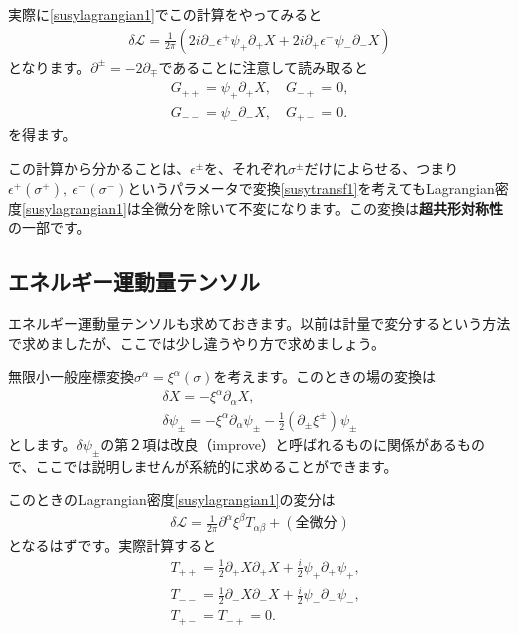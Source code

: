 \documentclass[report,paper=a4, fontsize=12pt, line_length=16cm, number_of_lines=34,dvipdfmx]{jlreq}
\numberwithin{equation}{chapter}
\numberwithin{equation}{section}
\newcommand{\del}{\partial}
\newcommand{\kyou}[1]{{\sffamily \bfseries #1}}
\newcommand{\Lcal}{\mathcal{L}}
\begin{document}
実際に\eqref{susylagrangian1}でこの計算をやってみると
\begin{align}
  \delta \Lcal = \frac{1}{2\pi}
  \left( 
    2i\del_{-}\epsilon^{+} \psi_{+}\del_{+}X +2i \del_{+}\epsilon^{-}\psi_{-}\del_{-}X
   \right)
\end{align}
となります。$\del^{\pm}=-2\del_{\mp}$であることに注意して読み取ると
\begin{align}
  G_{++}=\psi_{+}\del_{+}X,\quad G_{-+}=0,\nonumber\\
  G_{--}=\psi_{-}\del_{-}X,\quad G_{+-}=0.
\label{SUSYcurrent1}
\end{align}
を得ます。

この計算から分かることは、$\epsilon^{\pm}$を、それぞれ$\sigma^{\pm}$だけによらせる、つまり$\epsilon^{+}(\sigma^{+}),\ \epsilon^{-}(\sigma^{-})$というパラメータで変換\eqref{susytransf1}を考えてもLagrangian密度\eqref{susylagrangian1}は全微分を除いて不変になります。この変換は\kyou{超共形対称性}の一部です。

\subsection{エネルギー運動量テンソル}
エネルギー運動量テンソルも求めておきます。以前は計量で変分するという方法で求めましたが、ここでは少し違うやり方で求めましょう。

無限小一般座標変換$\sigma^{\alpha}=\xi^{\alpha}(\sigma)$を考えます。このときの場の変換は
\begin{align}
  \delta X=-\xi^{\alpha}\del_{\alpha}X,\\
  \delta \psi_{\pm}=-\xi^{\alpha}\del_{\alpha}\psi_{\pm}-\frac12(\del_{\pm}\xi^{\pm})\psi_{\pm}\label{susyconformaltransf}
\end{align}
とします。$\delta \psi_{\pm}$の第２項は改良（improve）と呼ばれるものに関係があるもので、ここでは説明しませんが系統的に求めることができます。

このときのLagrangian密度\eqref{susylagrangian1}の変分は
\begin{align}
  \delta \Lcal = \frac{1}{2\pi}\del^{\alpha}\xi^{\beta}T_{\alpha\beta}+(\text{全微分})
\end{align}
となるはずです。実際計算すると
\begin{align}
  &T_{++}=\frac12\del_{+}X\del_{+}X+\frac{i}{2}\psi_{+}\del_{+}\psi_{+},\nonumber\\
  &T_{--}=\frac12\del_{-}X\del_{-}X+\frac{i}{2}\psi_{-}\del_{-}\psi_{-},\nonumber\\
  &T_{+-}=T_{-+}=0.\label{EMtensorSUSYsystem}
\end{align}
\end{document}
